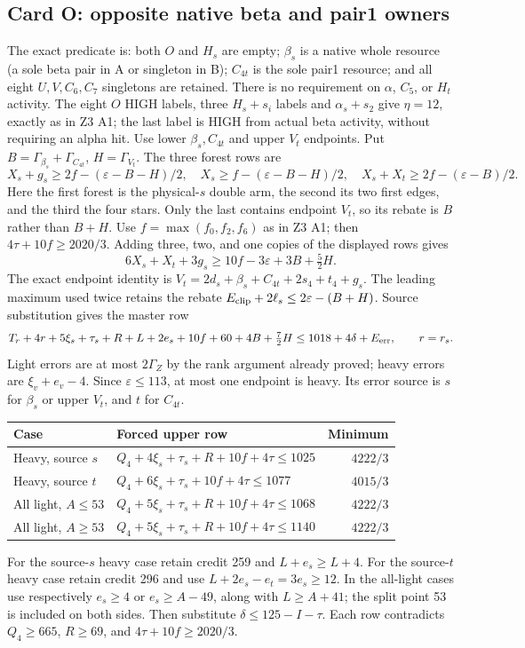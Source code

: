 \documentclass[11pt,letterpaper]{article}
\theoremstyle{definition}\newtheorem{definition}[theorem]{Definition}
\begin{document}
\subsection{Card O: opposite native beta and pair1 owners}\label{sec:z4-cardO}
The exact predicate is: both $O$ and $H_s$ are empty; $\beta_s$ is a native whole resource (a sole beta pair in A or singleton in B); $C_{4t}$ is the sole pair1 resource; and all eight $U,V,C_6,C_7$ singletons are retained. There is no requirement on $\alpha$, $C_5$, or $H_t$ activity.
The eight $O$ HIGH labels, three $H_s+s_i$ labels and $\alpha_s+s_2$ give $\eta=12$, exactly as in Z3 A1; the last label is HIGH from actual beta activity, without requiring an alpha hit.
Use lower $\beta_s,C_{4t}$ and upper $V_t$ endpoints. Put
$B=\Gamma_{\beta_s}+\Gamma_{C_{4t}}$, $H=\Gamma_{V_t}$.
The three forest rows are
\[
 X_s+g_s\ge2f-(\varepsilon-B-H)/2,\quad
 X_s\ge f-(\varepsilon-B-H)/2,\quad
 X_s+X_t\ge2f-(\varepsilon-B)/2.
\]
Here the first forest is the physical-$s$ double arm, the second its two first edges, and the third the four stars. Only the last contains endpoint $V_t$, so its rebate is $B$ rather than $B+H$.
Use $f=\max(f_0,f_2,f_6)$ as in Z3 A1; then
$4\tau+10f\ge2020/3$. Adding three, two, and one copies of the displayed rows gives
\[
 6X_s+X_t+3g_s\ge10f-3\varepsilon+3B+\tfrac52H.
\]
The exact endpoint identity is
$V_t=2d_s+\beta_s+C_{4t}+2s_4+t_4+g_s$.
The leading maximum used twice retains the rebate
$E_{\rm clip}+2\ell_s\le2\varepsilon-(B+H)$.
Source substitution gives the master row
\[
 T_r+4r+5\xi_s+\tau_s+R+L+2e_s+10f+60+4B+\tfrac72H
 \le1018+4\delta+E_{\rm err},\qquad r=r_s.
\]
Light errors are at most $2\Gamma_Z$ by the rank argument already proved; heavy errors are $\xi_v+e_v-4$. Since $\varepsilon\le113$, at most one endpoint is heavy. Its error source is $s$ for $\beta_s$ or upper $V_t$, and $t$ for $C_{4t}$.
\begin{center}\small
\begin{tabular}{p{.30\linewidth}p{.43\linewidth}r}
Case&Forced upper row&Minimum\\\hline
Heavy, source $s$&$Q_4+4\xi_s+\tau_s+R+10f+4\tau\le1025$&$4222/3$\\
Heavy, source $t$&$Q_4+6\xi_s+\tau_s+10f+4\tau\le1077$&$4015/3$\\
All light, $A\le53$&$Q_4+5\xi_s+\tau_s+R+10f+4\tau\le1068$&$4222/3$\\
All light, $A\ge53$&$Q_4+5\xi_s+\tau_s+R+10f+4\tau\le1140$&$4222/3$
\end{tabular}
\end{center}
For the source-$s$ heavy case retain credit 259 and $L+e_s\ge L+4$. For the source-$t$ heavy case retain credit 296 and use $L+2e_s-e_t=3e_s\ge12$. In the all-light cases use respectively $e_s\ge4$ or $e_s\ge A-49$, along with $L\ge A+41$; the split point 53 is included on both sides. Then substitute $\delta\le125-I-\tau$. Each row contradicts $Q_4\ge665$, $R\ge69$, and $4\tau+10f\ge2020/3$.
\end{document}
